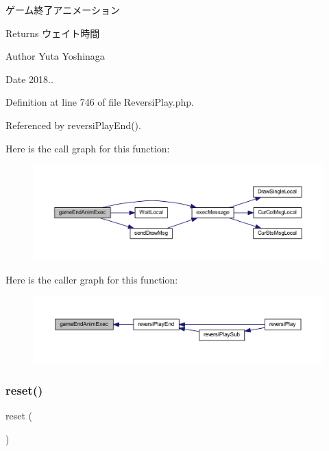 ゲーム終了アニメーション 

\begin{DoxyReturn}{Returns}
ウェイト時間 
\end{DoxyReturn}
\begin{DoxyAuthor}{Author}
Yuta Yoshinaga 
\end{DoxyAuthor}
\begin{DoxyDate}{Date}
2018.. 
\end{DoxyDate}


Definition at line 746 of file Reversi\+Play.\+php.



Referenced by reversi\+Play\+End().

Here is the call graph for this function\+:\nopagebreak
\begin{figure}[H]
\begin{center}
\leavevmode
\includegraphics[width=350pt]{class_reversi_play_acbcd366da8242203ae52fb685fbc929e_cgraph}
\end{center}
\end{figure}
Here is the caller graph for this function\+:\nopagebreak
\begin{figure}[H]
\begin{center}
\leavevmode
\includegraphics[width=350pt]{class_reversi_play_acbcd366da8242203ae52fb685fbc929e_icgraph}
\end{center}
\end{figure}
\mbox{\label{class_reversi_play_a4a20559544fdf4dcb457e258dc976cf8}} 
\subsubsection{\texorpdfstring{reset()}{reset()}}
{\footnotesize\ttfamily reset (\begin{DoxyParamCaption}{ }\end{DoxyParamCaption})}



